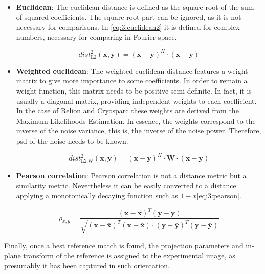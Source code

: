 \documentclass[../main.tex]{subfiles}
\begin{document}
\begin{itemize}
    \item \textbf{Euclidean}: The euclidean distance is defined as the square root of the sum of squared coefficients. The square root part can be ignored, as it is not necessary for comparisons. In \eqref{eq:3:euclidean2} it is defined for complex numbers, necessary for comparing in Fourier space.

    \begin{equation}\label{eq:3:euclidean2}
        dist^2_{\text{L2}}(\bm{x}, \bm{y}) = (\bm{x}-\bm{y})^H \cdot (\bm{x}-\bm{y})
    \end{equation}
    
    \item \textbf{Weighted euclidean}: The weighted euclidean distance features a weight matrix to give more importance to some coefficients. In order to remain a weight function, this matrix needs to be positive semi-definite. In fact, it is usually a diagonal matrix, providing independent weights to each coefficient. In the case of Relion\cite{scheres2021} and Cryosparc\cite{cryosparc} these weights are derived from the Maximum Likelihoods Estimation. In essence, the weights correspond to the inverse of the noise variance, this is, the inverse of the noise power. Therefore, \gls{psd} of the noise needs to be known.
    
    \begin{equation}\label{eq:3:euclidean2_weighted}
        dist^2_{\text{L2,W}}(\bm{x}, \bm{y}) = (\bm{x}-\bm{y})^H \cdot \bm{W} \cdot (\bm{x}-\bm{y})
    \end{equation}
    
    \item \textbf{Pearson correlation}: Pearson correlation is not a distance metric but a similarity metric. Nevertheless it can be easily converted to a distance applying a monotonically decaying function such as $1-x$\eqref{eq:3:pearson}.
    
    \begin{equation}\label{eq:3:pearson}
        \rho_{x,y} =    \frac{
                        (\bm{x}-\bar{\bm{x}})^T(\bm{y}-\bar{\bm{y}})
                        }{
                        \sqrt{(\bm{x}-\bar{\bm{x}})^T(\bm{x}-\bar{\bm{x}}) \cdot (\bm{y}-\bar{\bm{y}})^T(\bm{y}-\bar{\bm{y}})}
                        }
    \end{equation}
\end{itemize}

Finally, once a best reference match is found, the projection parameters and in-plane transform of the reference is assigned to the experimental image, as presumably it has been captured in such orientation.
\end{document}
